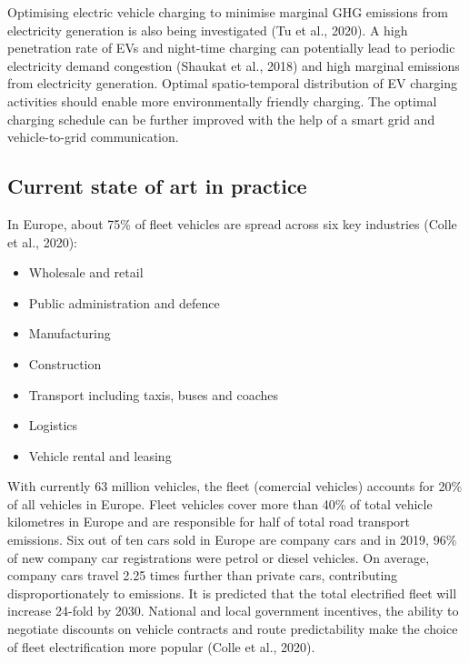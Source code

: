 \documentclass[
]{book}
\providecommand{\tightlist}{%
  \setlength{\itemsep}{0pt}\setlength{\parskip}{0pt}}
\begin{document}
Optimising electric vehicle charging to minimise marginal GHG emissions from electricity generation is also being investigated (Tu et al., 2020). A high penetration rate of EVs and night-time charging can potentially lead to periodic electricity demand congestion (Shaukat et al., 2018) and high marginal emissions from electricity generation. Optimal spatio-temporal distribution of EV charging activities should enable more environmentally friendly charging. The optimal charging schedule can be further improved with the help of a smart grid and vehicle-to-grid communication.

\hypertarget{current-state-of-art-in-practice-34}{%
\subsection*{Current state of art in practice}\label{current-state-of-art-in-practice-34}}

In Europe, about 75\% of fleet vehicles are spread across six key industries (Colle et al., 2020):

\begin{itemize}
\tightlist
\item
  Wholesale and retail
\item
  Public administration and defence
\item
  Manufacturing
\item
  Construction
\item
  Transport including taxis, buses and coaches
\item
  Logistics
\item
  Vehicle rental and leasing
\end{itemize}

With currently 63 million vehicles, the fleet (comercial vehicles) accounts for 20\% of all vehicles in Europe. Fleet vehicles cover more than 40\% of total vehicle kilometres in Europe and are responsible for half of total road transport emissions. Six out of ten cars sold in Europe are company cars and in 2019, 96\% of new company car registrations were petrol or diesel vehicles. On average, company cars travel 2.25 times further than private cars, contributing disproportionately to emissions. It is predicted that the total electrified fleet will increase 24-fold by 2030. National and local government incentives, the ability to negotiate discounts on vehicle contracts and route predictability make the choice of fleet electrification more popular (Colle et al., 2020).
\end{document}
